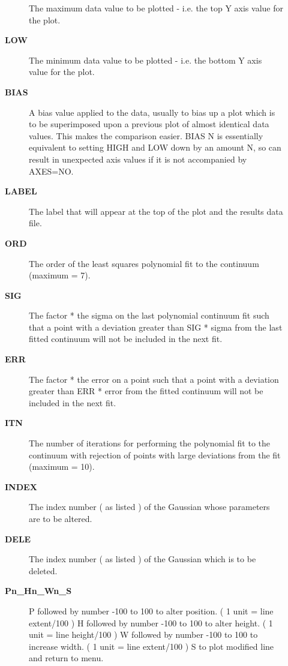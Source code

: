 \begin{description}
\begin{description}
 The maximum data value to be plotted - i.e. the top Y axis
 value for the plot.
\item [{\bf LOW}]
 The minimum data value to be plotted - i.e. the bottom Y axis
 value for the plot.
\item [{\bf BIAS}]
 A bias value applied to the data, usually to bias up a plot
 which is to be superimposed upon a previous plot of almost
 identical data values.  This makes the comparison easier.
 BIAS N is essentially equivalent to setting HIGH and LOW
 down by an amount N, so can result in unexpected axis
 values if it is not accompanied by AXES=NO.
\item [{\bf LABEL}]
 The label that will appear at the top of the plot and the
 results data file.
\item [{\bf ORD}]
 The order of the least squares polynomial fit to the
 continuum (maximum = 7).
\item [{\bf SIG}]
 The factor * the sigma on the last polynomial continuum fit
 such that a point with a deviation greater than SIG * sigma
 from the last fitted continuum will not be included in the
 next fit.
\item [{\bf ERR}]
 The factor * the error on a point such that a point with
 a deviation greater than ERR * error from the fitted
 continuum will not be included in the next fit.
\item [{\bf ITN}]
 The number of iterations for performing the polynomial fit
 to the continuum with rejection of points with large deviations
 from the fit (maximum = 10).
\item [{\bf INDEX}]
 The index number ( as listed ) of the Gaussian whose
 parameters are to be altered.
\item [{\bf DELE}]
 The index number ( as listed ) of the Gaussian which is to be
 deleted.
\item [{\bf Pn_Hn_Wn_S}]

 P followed by number -100 to 100 to alter position.
    ( 1 unit = line extent/100 )
 H followed by number -100 to 100 to alter height.
    ( 1 unit = line height/100 )
 W followed by number -100 to 100 to increase width.
    ( 1 unit = line extent/100 )
 S to plot modified line and return to menu.


\end{description}
\end{description}
